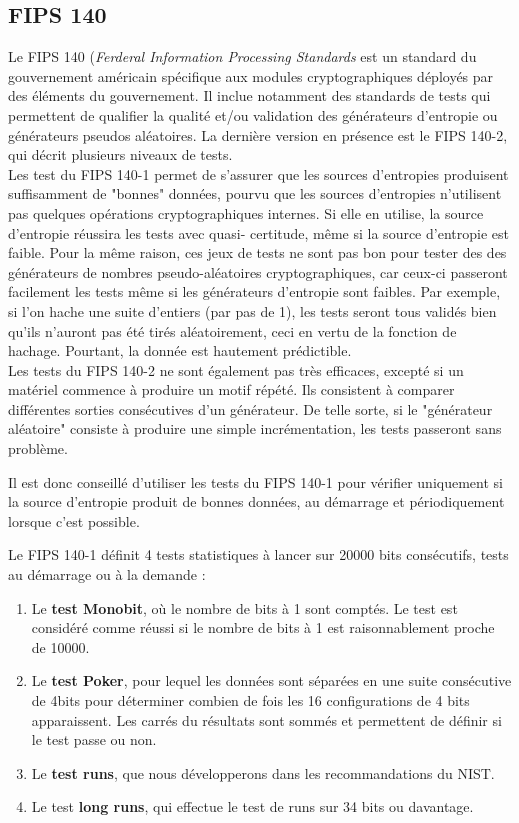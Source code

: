 \subsection{FIPS 140}
Le FIPS 140 (\textit{Ferderal Information Processing Standards}  est un standard du gouvernement américain spécifique aux modules cryptographiques déployés par des éléments du gouvernement. Il inclue notamment des standards de tests qui permettent de qualifier la qualité et/ou validation des générateurs d'entropie ou générateurs pseudos aléatoires. 
La dernière version en présence est le FIPS 140-2, qui décrit plusieurs niveaux de tests.\\


Les test du FIPS 140-1 permet de s'assurer que les sources d'entropies produisent suffisamment de "bonnes" données, pourvu que les sources d'entropies n'utilisent pas quelques opérations cryptographiques internes. Si elle en utilise, la source d'entropie réussira les tests avec quasi- certitude, même si la source d'entropie est faible. Pour la même raison,  ces jeux de tests ne sont pas bon pour tester des des générateurs de nombres pseudo-aléatoires cryptographiques, car ceux-ci passeront facilement les tests même si les générateurs d'entropie sont faibles. Par exemple, si l'on hache une suite d'entiers (par pas de 1), les tests seront tous validés bien qu'ils n'auront pas été tirés aléatoirement, ceci en vertu de la fonction de hachage. Pourtant, la donnée est hautement prédictible.\\


Les tests du FIPS 140-2 ne sont également pas très efficaces, excepté si un matériel commence à produire un motif répété. Ils consistent à comparer différentes sorties consécutives d'un générateur.  De telle sorte, si le "générateur aléatoire" consiste à produire une simple incrémentation, les tests passeront sans problème.

Il est donc conseillé d'utiliser les tests du FIPS 140-1 pour vérifier uniquement si la source d'entropie produit de bonnes données, au démarrage et périodiquement lorsque c'est possible. 


Le FIPS 140-1 définit 4 tests statistiques à lancer sur 20000 bits consécutifs, tests au démarrage ou à la demande : 
\begin{enumerate}
\item Le \textbf{test Monobit}, où le nombre de bits à 1 sont comptés. Le test est considéré comme réussi si le nombre de bits à 1 est raisonnablement proche de 10000.
\item Le \textbf{test Poker}, pour lequel les données sont séparées en une suite consécutive de 4bits pour déterminer combien de fois les 16 configurations de 4 bits apparaissent. Les carrés du résultats sont sommés  et permettent de définir si le test passe ou non. 
\item Le \textbf{test runs}, que nous développerons dans les recommandations du NIST.
\item Le test \textbf{long runs}, qui effectue le test de runs sur 34 bits ou davantage.\\
\end{enumerate}


